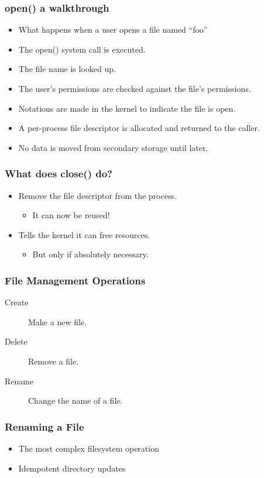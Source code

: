 \documentclass[pdftex]{beamer} %
\begin{document}
\begin{frame}
  \frametitle{open() a walkthrough}
  \begin{itemize}
  \item What happens when a user opens a file named ``foo''
  \item The open() system call is executed.
  \item The file name is looked up.
  \item The user's permissions are checked against the file's
    permissions.
  \item Notations are made in the kernel to indicate the file is open.
  \item A per-process file descriptor is allocated and returned to the
    caller.
  \item No data is moved from secondary storage until later.
  \end{itemize}
\end{frame}

\begin{frame}
  \frametitle{What does close() do?}
  \begin{itemize}
  \item Remove the file descriptor from the process.
    \begin{itemize}
    \item It can now be reused!
    \end{itemize}
  \item Tells the kernel it can free resources.
    \begin{itemize}
    \item But only if absolutely necessary.
    \end{itemize}
  \end{itemize}
\end{frame}

\begin{frame}
  \frametitle{File Management Operations}
  \begin{description}
  \item[Create] Make a new file.
  \item[Delete] Remove a file.
  \item[Rename] Change the name of a file.
  \end{description}
\end{frame}

\begin{frame}
  \frametitle{Renaming a File}
  \begin{itemize}
  \item The most complex filesystem operation
  \item Idempotent directory updates
  \end{itemize}
\end{frame}
\end{document}
